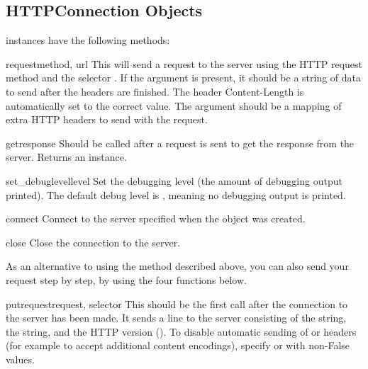 \subsection{HTTPConnection Objects \label{httpconnection-objects}}

 instances have the following methods:

\begin{methoddesc}{request}{method, url}
This will send a request to the server using the HTTP request method
 and the selector .  If the  argument is
present, it should be a string of data to send after the headers are finished.
The header Content-Length is automatically set to the correct value.
The  argument should be a mapping of extra HTTP headers to send
with the request.
\end{methoddesc}

\begin{methoddesc}{getresponse}{}
Should be called after a request is sent to get the response from the server.
Returns an  instance.
\end{methoddesc}

\begin{methoddesc}{set_debuglevel}{level}
Set the debugging level (the amount of debugging output printed).
The default debug level is , meaning no debugging output is
printed.
\end{methoddesc}

\begin{methoddesc}{connect}{}
Connect to the server specified when the object was created.
\end{methoddesc}

\begin{methoddesc}{close}{}
Close the connection to the server.
\end{methoddesc}

As an alternative to using the  method described above,
you can also send your request step by step, by using the four functions
below.

\begin{methoddesc}{putrequest}{request, selector}
This should be the first call after the connection to the server has
been made.  It sends a line to the server consisting of the
 string, the  string, and the HTTP version
().  To disable automatic sending of  or
 headers (for example to accept additional
content encodings), specify  or 
with non-False values.
\end{methoddesc}

